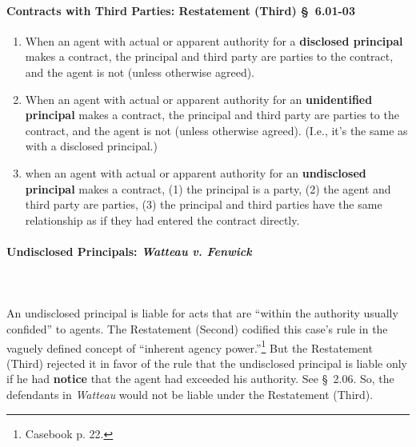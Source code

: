 \paragraph{Contracts with Third Parties: Restatement (Third) \S\ 6.01-03}

\begin{enumerate}
    \item When an agent with actual or apparent authority for a 
    \textbf{disclosed principal} makes a contract, the principal and third 
    party are parties to the contract, and the agent is not (unless otherwise 
    agreed).
    \item When an agent with actual or apparent authority for an 
    \textbf{unidentified principal} makes a contract, the principal and third 
    party are parties to the contract, and the agent is not (unless otherwise 
    agreed). (I.e., it's the same as with a disclosed principal.)
    \item when an agent with actual or apparent authority for an
    \textbf{undisclosed principal} makes a contract, (1) the principal is a 
    party, (2) the agent and third party are parties, (3) the principal and 
    third parties have the same relationship as if they had entered the 
    contract directly.
\end{enumerate}

\paragraph{Undisclosed Principals: \emph{Watteau v. Fenwick}}
~\\\\
An undisclosed principal is liable for acts that are ``within the authority 
usually confided'' to agents.  The Restatement (Second) codified this case's 
rule in the vaguely defined concept of ``inherent agency 
power.''\footnote{Casebook p. 22.} But the Restatement (Third) rejected it in 
favor of the rule that the undisclosed principal is liable only if he had 
\textbf{notice} that the agent had exceeded his authority. See \S\ 2.06. So, 
the defendants in \emph{Watteau} would not be liable under the Restatement 
(Third).

